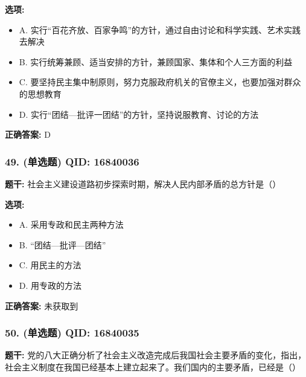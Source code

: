 \documentclass[12pt,UTF8]{ctexart}
\begin{document}
\textbf{选项:}
\begin{itemize}[leftmargin=*]

  \item A. 实行“百花齐放、百家争鸣”的方针，通过自由讨论和科学实践、艺术实践去解决

  \item B. 实行统筹兼顾、适当安排的方针，兼顾国家、集体和个人三方面的利益

  \item C. 要坚持民主集中制原则，努力克服政府机关的官僚主义，也要加强对群众的思想教育

  \item D. 实行“团结—批评一团结”的方针，坚持说服教育、讨论的方法

\end{itemize}

\textbf{正确答案:}
D

\vspace{0.3em}\hrulefill\vspace{0.7em}

\subsubsection*{49. (单选题) \small QID: 16840036}

\textbf{题干:}
社会主义建设道路初步探索时期，解决人民内部矛盾的总方针是（）

\textbf{选项:}
\begin{itemize}[leftmargin=*]

  \item A. 采用专政和民主两种方法

  \item B. “团结—批评—团结”

  \item C. 用民主的方法

  \item D. 用专政的方法

\end{itemize}

\textbf{正确答案:}
未获取到

\vspace{0.3em}\hrulefill\vspace{0.7em}

\subsubsection*{50. (单选题) \small QID: 16840035}

\textbf{题干:}
党的八大正确分析了社会主义改造完成后我国社会主要矛盾的变化，指出，社会主义制度在我国已经基本上建立起来了。我们国内的主要矛盾，已经是（）
\end{document}
